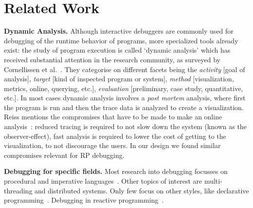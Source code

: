 \section{Related Work}

\textbf{Dynamic Analysis.}
Although interactive debuggers are commonly used for debugging 
of the runtime behavior of programs, more specialized tools already exist: 
the study of program execution is called `dynamic analysis' which has 
received substantial attention in the research community,
as surveyed by Cornellissen et al.~\cite{cornelissen2009systematic}.
They categorise on different facets being the 
\textit{activity} [goal of analysis],
\textit{target} [kind of inspected program or system],
\textit{method} [visualization, metrics, online, querying, etc.],
\textit{evaluation} [preliminary, case study, quantitative, etc.].
In most cases dynamic analysis involves a \textit{post mortem} analysis, 
where first the program is run and then the trace data is analyzed to create a visualization.
Reiss mentions the compromises that have to be made to make an online analysis~\cite{reiss2006visualizing}: 
reduced tracing is required to not slow down the system (known as the observer-effect), 
fast analysis is required to lower the cost of getting to the visualization, to not discourage the users.
In our design we found similar compromises relevant for RP debugging.


\textbf{Debugging for specific fields.}
Most research into debugging focusses on procedural and 
imperative languages~\cite{cornelissen2009systematic}.
Other topics of interest are multi-threading and distributed systems.
Only few focus on other styles, like 
declarative programming~\cite{nilsson1998declarative}.
Debugging in reactive programming~\cite{
	salvaneschi2014empirical,salvaneschi2016debugging}.
	

